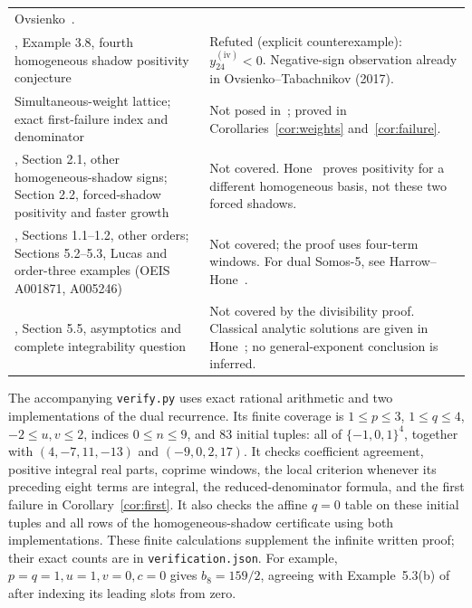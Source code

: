 \documentclass[11pt]{article}
\begin{document}
\begin{longtable}{@{}>{\raggedright\arraybackslash}p{}>{\raggedright\arraybackslash}p{}@{}}
 Ovsienko~\cite{Ovs}.\\[3pt]
\cite{Hone}, Example 3.8, fourth homogeneous shadow positivity conjecture
 & Refuted (explicit counterexample): $y^{(\mathrm{iv})}_{24}<0$.
 Negative-sign observation already in Ovsienko--Tabachnikov (2017).\\[3pt]
Simultaneous-weight lattice; exact first-failure index and denominator
 & Not posed in~\cite{OT}; proved in
 Corollaries~\ref{cor:weights} and~\ref{cor:failure}.\\[3pt]
\cite{OT}, Section 2.1, other homogeneous-shadow signs;
 Section 2.2, forced-shadow positivity and faster growth
 & Not covered. Hone~\cite[Example~3.8]{Hone} proves positivity for a
 different homogeneous basis, not these two forced shadows.\\[3pt]
\cite{OT}, Sections 1.1--1.2, other orders; Sections 5.2--5.3,
 Lucas and order-three examples (OEIS A001871, A005246)
 & Not covered; the proof uses four-term windows. For dual Somos-5,
 see Harrow--Hone~\cite{HH}.\\[3pt]
\cite{OT}, Section 5.5, asymptotics and complete integrability question
 & Not covered by the divisibility proof. Classical analytic solutions
 are given in Hone~\cite{Hone}; no general-exponent conclusion is inferred.\\
\bottomrule
\end{longtable}
\normalsize

The accompanying \texttt{verify.py} uses exact rational arithmetic and
two implementations of the dual recurrence. Its finite coverage is
$1\le p\le3$, $1\le q\le4$, $-2\le u,v\le2$, indices $0\le n\le9$,
and $83$ initial tuples: all of $\{-1,0,1\}^4$, together with
$(4,-7,11,-13)$ and $(-9,0,2,17)$. It checks coefficient agreement,
positive integral real parts, coprime windows, the local criterion
whenever its preceding eight terms are integral, the reduced-denominator
formula, and the first failure in Corollary~\ref{cor:first}.
It also checks the affine $q=0$ table on these initial tuples and all
rows of the homogeneous-shadow certificate using both implementations.
These finite calculations supplement the
infinite written proof; their exact counts are in \texttt{verification.json}.
For example, $p=q=1,u=1,v=0,c=0$ gives $b_8=159/2$, agreeing with
Example~5.3(b) of~\cite{OT} after indexing its leading slots from zero.
\end{document}
